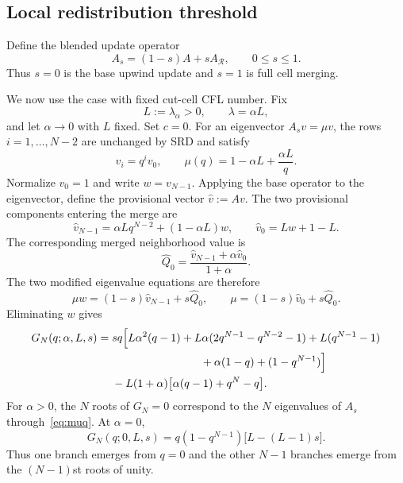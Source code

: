\documentclass[preprint,12pt]{elsarticle}
\begin{document}
\subsection{Local redistribution threshold}
\label{sec:criterion}

Define the blended update operator
\begin{equation}
    A_s=(1-s)A+sA_{\mathcal R},
    \qquad 0\le s\le1.
    \label{eq:As}
\end{equation}
Thus $s=0$ is the base upwind update and $s=1$ is full cell merging.

We now use the case with fixed cut-cell CFL number.  Fix
\[
    L:=\lambda_\alpha>0,
    \qquad
    \lambda=\alpha L,
\]
and let $\alpha\to0$ with $L$ fixed.  Set $c=0$.  For an eigenvector
$A_sv=\mu v$, the rows $i=1,\ldots,N-2$ are unchanged by SRD and satisfy
\begin{equation}
    v_i=q^i v_0,
    \qquad
    \mu(q)=1-\alpha L+\frac{\alpha L}{q}.
    \label{eq:muq}
\end{equation}
Normalize $v_0=1$ and write $w=v_{N-1}$.  Applying the base operator to the
eigenvector, define the provisional vector $\widehat v:=Av$.  The two
provisional components entering the merge are
\begin{equation}
    \widehat v_{N-1}
    =
    \alpha L q^{N-2}+(1-\alpha L)w,
    \qquad
    \widehat v_0=Lw+1-L.
    \label{eq:vhat-two}
\end{equation}
The corresponding merged neighborhood value is
\[
    \widehat Q_0
    =
    \frac{\widehat v_{N-1}+\alpha\widehat v_0}{1+\alpha}.
\]
The two modified eigenvalue equations are therefore
\[
    \mu w=(1-s)\widehat v_{N-1}+s\widehat Q_0,
    \qquad
    \mu=(1-s)\widehat v_0+s\widehat Q_0.
\]
Eliminating $w$ gives
\begin{align}
G_N(q;\alpha,L,s)
={}&s q\Bigl[
L\alpha^2(q-1)
+L\alpha(2q^{N-1}-q^{N-2}-1)
+L(q^{N-1}-1) \notag\\
&\hspace{2.8cm}
+\alpha(1-q)+(1-q^{N-1})
\Bigr] \notag\\
&-L(1+\alpha)\bigl[\alpha(q-1)+q^N-q\bigr].
\label{eq:GN}
\end{align}
For $\alpha>0$, the $N$ roots of $G_N=0$ correspond to the $N$ eigenvalues
of $A_s$ through~\eqref{eq:muq}.  At $\alpha=0$,
\begin{equation}
    G_N(q;0,L,s)
    =
    q(1-q^{N-1})\bigl[L-(L-1)s\bigr].
    \label{eq:GN0}
\end{equation}
Thus one branch emerges from $q=0$ and the other $N-1$ branches emerge from
the $(N-1)$st roots of unity.
\end{document}
